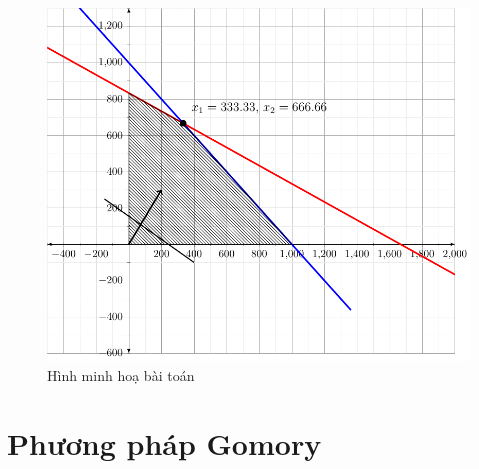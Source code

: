 \documentclass[12pt,a4paper]{report}
\begin{document}
\begin{figure}
\centering
\includegraphics[width=0.8\linewidth]{plot.pdf}
\caption{Hình minh hoạ bài toán}
\end{figure}



\section{Phương pháp Gomory}
\end{document}
